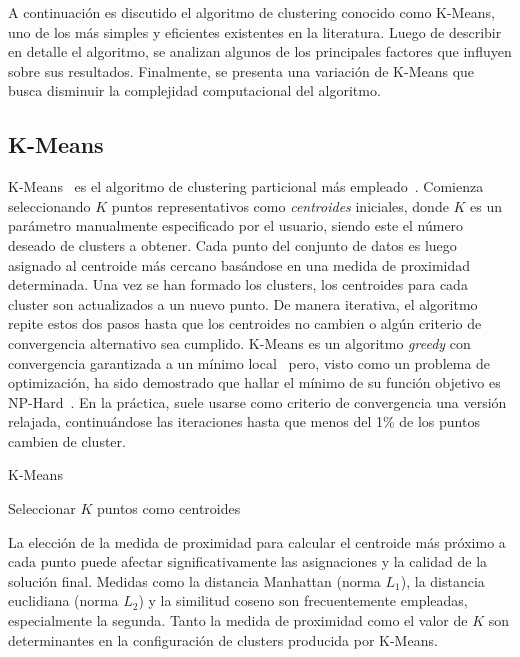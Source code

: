 A continuación es discutido el algoritmo de clustering conocido como K-Means, uno de los más simples y eficientes existentes en la literatura.
Luego de describir en detalle el algoritmo, se analizan algunos de los principales factores que influyen sobre sus resultados.
Finalmente, se presenta una variación de K-Means que busca disminuir la complejidad computacional del algoritmo.

\subsection{K-Means}\label{subsec:k-means}

K-Means~\cite{MacQueen67} es el algoritmo de clustering particional más empleado~\cite{Aggarawal13}.
Comienza seleccionando $K$ puntos representativos como \textit{centroides} iniciales, donde $K$ es un parámetro manualmente especificado por el usuario, siendo este el número deseado de clusters a obtener.
Cada punto del conjunto de datos es luego asignado al centroide más cercano basándose en una medida de proximidad determinada.
Una vez se han formado los clusters, los centroides para cada cluster son actualizados a un nuevo punto.
De manera iterativa, el algoritmo repite estos dos pasos hasta que los centroides no cambien o algún criterio de convergencia alternativo sea cumplido.
K-Means es un algoritmo \textit{greedy} con convergencia garantizada a un mínimo local~\cite{Selim84} pero, visto como un problema de optimización, ha sido demostrado que hallar el mínimo de su función objetivo es NP-Hard~\cite{Manning08}.
En la práctica, suele usarse como criterio de convergencia una versión relajada, continuándose las iteraciones hasta que menos del 1\% de los puntos cambien de cluster.

\begin{algorithm}
    \caption{K-Means}
    \label{algorithm:KMeans}
    Seleccionar $K$ puntos como centroides\;
\end{algorithm}

La elección de la medida de proximidad para calcular el centroide más próximo a cada punto puede afectar significativamente las asignaciones y la calidad de la solución final.
Medidas como la distancia Manhattan (norma $L_1$), la distancia euclidiana (norma $L_2$) y la similitud coseno son frecuentemente empleadas, especialmente la segunda.
Tanto la medida de proximidad como el valor de $K$ son determinantes en la configuración de clusters producida por K-Means.

